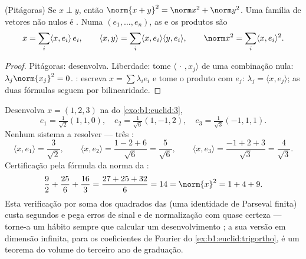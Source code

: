 \begin{proposition}\label{prop:b1:euclid:orthfree}
(Pitágoras) Se $x \perp y$, então $\norm{x+y}^2 = \norm x^2 + \norm y^2$. Uma
família  de vetores não nulos é . Numa  
$(e_1, \dots,
e_n)$, as  e os produtos são
\[
x = \sum_{i} \langle x, e_i\rangle\, e_i,
\qquad
\langle x, y \rangle = \sum_i \langle x, e_i\rangle \langle y,
e_i\rangle,
\qquad
\norm x^2 = \sum_i \langle x, e_i\rangle^2 .
\]
\end{proposition}

\begin{proof}
Pitágoras: desenvolva. Liberdade: tome $\langle\,\cdot\,, x_j\rangle$ de uma combinação nula:
$\lambda_j \norm{x_j}^2 = 0$. : escreva $x = \sum \lambda_i e_i$ e tome o produto com $e_j$: $\lambda_j = \langle x, e_j\rangle$;
as duas fórmulas seguem por bilinearidade.
\end{proof}

\begin{example}
\label{ex:b1:euclid:parsevalcheck}
Desenvolva $x = (1, 2, 3)$ na   do \cref{exo:b1:euclid:3},
\[
e_1 = \tfrac{1}{\sqrt2}(1,1,0), \quad
e_2 = \tfrac{1}{\sqrt6}(1,-1,2), \quad
e_3 = \tfrac{1}{\sqrt3}(-1,1,1).
\]
Nenhum sistema a resolver --- três :
\[
\langle x, e_1\rangle = \frac{3}{\sqrt2},
\qquad
\langle x, e_2\rangle = \frac{1 - 2 + 6}{\sqrt6} =
\frac{5}{\sqrt6},
\qquad
\langle x, e_3\rangle = \frac{-1 + 2 + 3}{\sqrt3} =
\frac{4}{\sqrt3}.
\]
Certificação pela fórmula da norma da :
\[
\frac{9}{2} + \frac{25}{6} + \frac{16}{3}
= \frac{27 + 25 + 32}{6} = 14 = \norm{x}^2 = 1 + 4 + 9 .
\]
Esta verificação por soma dos quadrados das  (uma
identidade de Parseval finita) custa segundos e pega erros de sinal
e de normalização com quase certeza --- torne-a um hábito sempre que
calcular um desenvolvimento ; a sua versão em dimensão
infinita, para os coeficientes de Fourier do \cref{ex:b1:euclid:trigortho}, é um teorema do
volume do terceiro ano de graduação.
\end{example}


